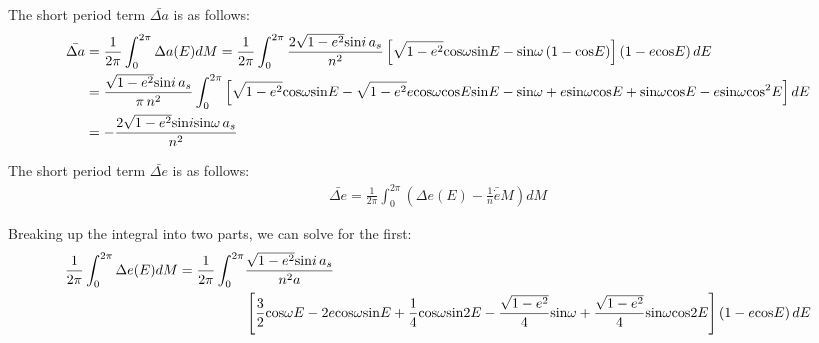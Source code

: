 \documentclass[]{aiaa-tc}%
\begin{document}
\subsection{}
The short period term $\bar{\Delta a}$ is as follows:
	\begin{equation} 
\begin{aligned}
\bar{\Delta a} &= \frac{1}{2\pi}\int_{0}^{2\pi}\Delta a(E) dM =\frac{1}{2\pi}\int_{0}^{2\pi}\frac{2\sqrt{1-e^2}\textup{sin}i\,a_s}{n^2}\left [ \sqrt{1-e^2}\textup{cos}\omega \textup{sin}E -\textup{sin}\omega\left ( 1-\textup{cos}E \right ) \right ]\left ( 1-e\textup{cos}E \right )dE \\
&= \frac{\sqrt{1-e^2}\textup{sin}i\,a_s}{\pi\,n^2}\int_{0}^{2\pi} \left [ \sqrt{1-e^2}\textup{cos}\omega \textup{sin}E -\sqrt{1-e^2}e\textup{cos}\omega \textup{cos}E\textup{sin}E -\textup{sin}\omega +e\textup{sin}\omega \textup{cos}E +\textup{sin}\omega \textup{cos}E-e\textup{sin}\omega \textup{cos}^2E \right ]dE \\
&=-\frac{2\sqrt{1-e^2}\textup{sin}i\textup{sin}\omega\,a_s}{n^2}
 \end{aligned}
	\end{equation} 

The short period term $\bar{\Delta e}$ is as follows:
	\begin{equation} 
\begin{aligned}
\bar{\Delta e} = \frac{1}{2\pi}\int_{0}^{2\pi}\left (\Delta e(E) -\frac{1}{n}\bar{\dot{e}}M \right ) dM 
 \end{aligned}
\label{eqn:overall_debar}
	\end{equation} 

Breaking up the integral into two parts, we can solve for the first:
	\begin{equation} 
\begin{aligned}
\frac{1}{2\pi}\int_{0}^{2\pi}\Delta e(E)dM = \frac{1}{2\pi}\int_{0}^{2\pi}&\frac{\sqrt{1-e^2}\textup{\textup{sin}}i\,a_s}{n^2a} \\ &\left [ \frac{3}{2}\textup{\textup{cos}}\omega E -2e\textup{cos}\omega \textup{sin}E +\frac{1}{4}\textup{cos}\omega \textup{sin}2E-\frac{\sqrt{1-e^2}}{4}\textup{sin}\omega +\frac{\sqrt{1-e^2}}{4}\textup{sin}\omega \textup{cos}2E\right ]\left ( 1-e\textup{cos}E \right )dE
 \end{aligned}
	\end{equation} 
\end{document}
